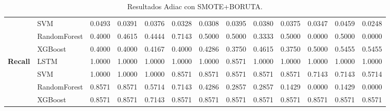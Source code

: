 \begin{table}[h]
\begin{adjustbox}{max width=15cm}
\begin{tabular}{|c|l|r|r|r|r|r|r|r|r|r|r|r|}
			& SVM &  0.0493 &  0.0391 &  0.0376 &  0.0328 &  0.0308 &  0.0395 &  0.0380 &  0.0375 &  0.0347 &  0.0459 &  0.0248 \\
			& RandomForest &  0.4000 &  0.4615 &  0.4444 &  0.7143 &  0.5000 &  0.5000 &  0.3333 &  0.5000 &  0.0000 &  0.5000 &  0.0000 \\
			& XGBoost &  0.4000 &  0.4000 &  0.4167 &  0.4000 &  0.4286 &  0.3750 &  0.4615 &  0.3750 &  0.5000 &  0.5455 &  0.5455 \\
			\hline
			\textbf{Recall} & LSTM &  1.0000 &  1.0000 &  1.0000 &  1.0000 &  1.0000 &  0.8571 &  1.0000 &  1.0000 &  1.0000 &  1.0000 &  1.0000 \\
			& SVM &  1.0000 &  1.0000 &  1.0000 &  0.8571 &  0.8571 &  0.8571 &  0.8571 &  0.8571 &  0.7143 &  0.7143 &  0.5714 \\
			& RandomForest &  0.8571 &  0.8571 &  0.5714 &  0.7143 &  0.4286 &  0.2857 &  0.2857 &  0.1429 &  0.0000 &  0.1429 &  0.0000 \\
			& XGBoost &  0.8571 &  0.8571 &  0.7143 &  0.8571 &  0.8571 &  0.8571 &  0.8571 &  0.8571 &  0.8571 &  0.8571 &  0.8571 \\
			\hline
		\end{tabular}
	\end{adjustbox}
	\caption{Resultados Adiac con SMOTE+BORUTA.}
	\label{tab:Adiac_SMOTE_BORUTA}
\end{table}

